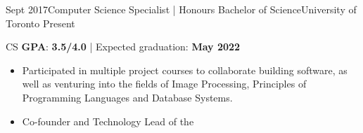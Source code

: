 %
%
%


\begin{experiences}
  \university
    {Sept 2017}{Computer Science Specialist | Honours Bachelor of Science}{University of Toronto}
    {Present} {
                      CS \textbf{GPA}: \textbf{3.5/4.0} | Expected graduation: \textbf{May 2022}
                      \begin{itemize}
                        \item Participated in multiple project courses to collaborate building software, as well as venturing into the fields of Image Processing, Principles of Programming Languages and Database Systems.
                        \item Co-founder and Technology Lead of the                                                        
                      \end{itemize}
                    }
\end{experiences}
